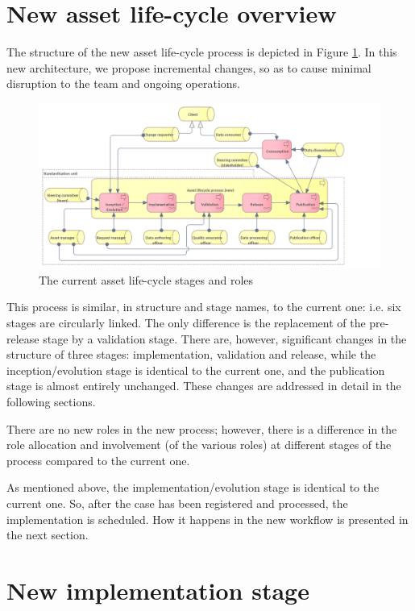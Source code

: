 	\section{New asset life-cycle overview}
	\label{sec:lifecycle-new}	
	
	The structure of the new asset life-cycle process is depicted in Figure \ref{fig:lifecycle-new}. In this new architecture, we propose incremental changes, so as to cause minimal disruption to the team and ongoing operations. 

	\begin{figure}[h]
		\centering
		\includegraphics[width=1.05\textwidth]{images/business/Lifecycle (new).png}
		\caption{The current asset life-cycle stages and roles}
		\label{fig:lifecycle-new}
	\end{figure}
	
	This process is similar, in structure and stage names, to the current one: i.e. six stages are circularly linked. The only difference is the replacement of the pre-release stage by a validation stage. There are, however, significant changes in the structure of three stages: implementation, validation and release, while the inception/evolution stage is identical to the current one, and the publication stage is almost entirely unchanged. These changes are addressed in detail in the following sections.
		
	There are no new roles in the new process; however, there is a difference in the role allocation and involvement (of the various roles) at different stages of the process compared to the current one. 
	
	As mentioned above, the implementation/evolution stage is identical to the current one. So, after the case has been registered and processed, the implementation is scheduled. How it happens in the new workflow is presented in the next section. 
			
	\section{New implementation stage}
	\label{sec:implementation-new}

